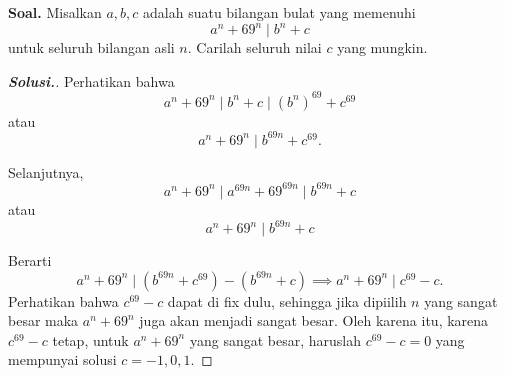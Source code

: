  \textbf{Soal.} Misalkan $a,b,c$ adalah suatu bilangan bulat yang memenuhi 
 	$$a^n + 69^n \mid b^n + c$$ untuk seluruh bilangan asli $n$. Carilah seluruh nilai $c$ yang mungkin.
 	\newpage
 	\begin{proof}[\textbf{Solusi.}]
 	 Perhatikan bahwa \[a^n+69^n \mid b^{n}+c \mid (b^n)^{69}+c^{69}\] atau \[a^n + 69^n \mid b^{69n}+c^{69}.\]
 		
 		Selanjutnya, \[a^n+69^n \mid a^{69n} + 6 9^{69n}\mid b^{69n} + c\] atau \[ a^n+69^n \mid b^{69n} + c\]
 		
 		Berarti 
 		\[a^n+69^n \mid (b^{69n}+c^{69})-(b^{69n} + c) \implies a^n+69^n \mid c^{69}-c.\]
 		Perhatikan bahwa $c^{69}-c$ dapat di fix dulu, sehingga jika dipiilih $n$ yang sangat besar maka $a^n+69^n$ juga akan menjadi sangat besar. Oleh karena itu, karena $c^{69}-c$ tetap, untuk $a^n+69^n$ yang sangat besar, haruslah $c^{69}-c=0$ yang mempunyai solusi $c=\boxed{-1,0,1}$.
 	\end{proof}
